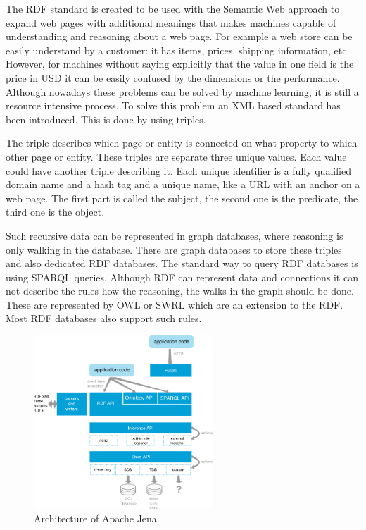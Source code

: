The RDF standard\cite{rdf} is created to be used with the Semantic Web approach to expand web pages with additional meanings that makes machines capable of understanding and reasoning about a web page. For example a web store can be easily understand by a customer: it has items, prices, shipping information, etc. However, for machines without saying explicitly that the value in one field is the price in USD it can be easily confused by the dimensions or the performance. Although nowadays these problems can be solved by machine learning, it is still a resource intensive process. To solve this problem an XML based standard has been introduced. This is done by using triples. 

The triple describes which page or entity is connected on what property to which other page or entity. These triples are separate three unique values. Each value could have another triple describing it. Each unique identifier is a fully qualified domain name and a hash tag and a unique name, like a URL with an anchor on a web page. The first part is called the subject, the second one is the predicate, the third one is the object. 

Such recursive data can be represented in graph databases, where reasoning is only walking in the database. There are graph databases to store these triples and also dedicated RDF databases. The standard way to query RDF databases is using SPARQL queries. Although RDF can represent data and connections it can not describe the rules how the reasoning, the walks in the graph should be done. These are represented by OWL or SWRL which are an extension to the RDF. Most RDF databases also support such rules.

\begin{figure}[h]
\centering
\includegraphics[width=0.6\textwidth]{figures/jena-architecture.png}
\caption{Architecture of Apache Jena\label{fig:jena}}
\end{figure}


